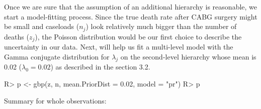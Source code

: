 \documentclass[article]{jss}
\begin{document}
Once we are sure that the assumption of an additional hierarchy is reasonable, we start a model-fitting process.  Since the true death rate after CABG surgery might be small and caseloads ($n_{j}$) look relatively much bigger than the number of deaths ($z_{j}$), the Poisson distribution would be our first choice to describe the uncertainty in our data. Next,  will help us fit a multi-level model with the Gamma conjugate distribution for $\lambda_{j}$ on the second-level hierarchy whose mean is 0.02 ($\lambda_{0}=0.02$) as described in the section 3.2.
\begin{CodeChunk}
\begin{CodeInput}
R> p <- gbp(z, n, mean.PriorDist = 0.02, model = "pr")
R> p
\end{CodeInput}
\begin{CodeOutput}
Summary for whole observations: 


\end{CodeOutput}
\end{CodeChunk}
\end{document}
